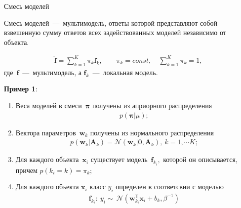 \documentclass[9pt,pdf,hyperref={unicode}]{beamer}
\begin{document}
\begin{frame}{Смесь моделей}
\justifying
\begin{definition}
Смесь моделей~---~мультимодель, ответы которой представляют собой взвешенную сумму ответов всех задействованных моделей независимо от объекта.

\begin{equation}
\label{sl:2:eq:1}
	\begin{aligned}
		\hat{\textbf{f}} = \sum_{k=1}^{K}\pi_{k}\textbf{f}_k, \qquad \pi_{k} = const, \quad \sum_{k=1}^{K}\pi_{k} = 1,
	\end{aligned}
\end{equation}
где~$\textbf{f}$~---~мультимодель, а $\textbf{f}_k$~---~локальная модель.
\end{definition}

{\bf Пример 1}:
\begin{enumerate}
	\item Веса моделей в смеси~$\bm{\pi}$ получены из априорного распределения 
		\begin{equation}
		\label{sl:2:eq:2}
			\begin{aligned}
				p\left(\bm{\pi}|\mu\right);
			\end{aligned}
		\end{equation}
	\item Вектора параметров~$\textbf{w}_k$ получены из нормального распределения 
		\begin{equation}
		\label{sl:2:eq:3}
			\begin{aligned}
				p\left(\textbf{w}_k|\textbf{A}_k\right) = \mathcal{N}\left(\textbf{w}_k|\textbf{0}, \textbf{A}_{k}\right),~k=1,\cdots K;
			\end{aligned}
		\end{equation}
		
	\item Для каждого объекта~$\textbf{x}_i$ существует модель~$\textbf{f}_{k_i},$ которой он описывается, причем $p\left(k_i=k\right) = \pi_k;$
	
	\item  Для каждого объекта $\textbf{x}_i$ класс $y_i$ определен в соответсвии с моделью 
		\begin{equation}
		\label{sl:2:eq:3}
			\begin{aligned}
				\textbf{f}_{k_i}:~y_i\sim~\mathcal{N}\left(\textbf{w}_{k_i}^{\mathsf{T}}\textbf{x}_i + b_k, \beta^{-1}\right)
			\end{aligned}
		\end{equation}
\end{enumerate}

\end{frame}
\end{document}

